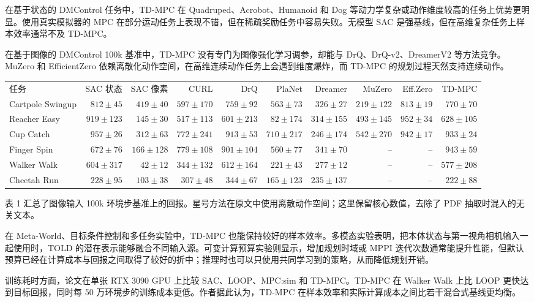 \documentclass[10pt]{article}
\begin{document}
在基于状态的 DMControl 任务中，TD-MPC 在 Quadruped、Acrobot、Humanoid 和 Dog 等动力学复杂或动作维度较高的任务上优势更明显。使用真实模拟器的 MPC 在部分运动任务上表现不错，但在稀疏奖励任务中容易失败。无模型 SAC 是强基线，但在高维复杂任务上样本效率通常不及 TD-MPC。

在基于图像的 DMControl 100k 基准中，TD-MPC 没有专门为图像强化学习调参，却能与 DrQ、DrQ-v2、DreamerV2 等方法竞争。MuZero 和 EfficientZero 依赖离散化动作空间，在高维连续动作任务上会遇到维度爆炸，而 TD-MPC 的规划过程天然支持连续动作。

\begin{center}
\scriptsize
\begin{tabular}{lrrrrrrrrr}
任务 & SAC 状态 & SAC 像素 & CURL & DrQ & PlaNet & Dreamer & MuZero & Eff.Zero & TD-MPC \\
Cartpole Swingup & $812\pm45$ & $419\pm40$ & $597\pm170$ & $759\pm92$ & $563\pm73$ & $326\pm27$ & $219\pm122$ & $813\pm19$ & $770\pm70$ \\
Reacher Easy & $919\pm123$ & $145\pm30$ & $517\pm113$ & $601\pm213$ & $82\pm174$ & $314\pm155$ & $493\pm145$ & $952\pm34$ & $628\pm105$ \\
Cup Catch & $957\pm26$ & $312\pm63$ & $772\pm241$ & $913\pm53$ & $710\pm217$ & $246\pm174$ & $542\pm270$ & $942\pm17$ & $933\pm24$ \\
Finger Spin & $672\pm76$ & $166\pm128$ & $779\pm108$ & $901\pm104$ & $560\pm77$ & $341\pm70$ & -- & -- & $943\pm59$ \\
Walker Walk & $604\pm317$ & $42\pm12$ & $344\pm132$ & $612\pm164$ & $221\pm43$ & $277\pm12$ & -- & -- & $577\pm208$ \\
Cheetah Run & $228\pm95$ & $103\pm38$ & $307\pm48$ & $344\pm67$ & $165\pm123$ & $235\pm137$ & -- & -- & $222\pm88$ \\
\end{tabular}
\end{center}

表 1 汇总了图像输入 100k 环境步基准上的回报。星号方法在原文中使用离散动作空间；这里保留核心数值，去除了 PDF 抽取时混入的无关文本。

在 Meta-World、目标条件控制和多任务实验中，TD-MPC 也能保持较好的样本效率。多模态实验表明，把本体状态与第一视角相机输入一起使用时，TOLD 的潜在表示能够融合不同输入源。可变计算预算实验则显示，增加规划时域或 MPPI 迭代次数通常能提升性能，但默认预算已经在计算成本与回报之间取得了较好的折中；推理时也可以只使用共同学习到的策略，从而降低规划开销。

训练耗时方面，论文在单张 RTX 3090 GPU 上比较 SAC、LOOP、MPC:sim 和 TD-MPC。TD-MPC 在 Walker Walk 上比 LOOP 更快达到目标回报，同时每 50 万环境步的训练成本更低。作者据此认为，TD-MPC 在样本效率和实际计算成本之间比若干混合式基线更均衡。
\end{document}
